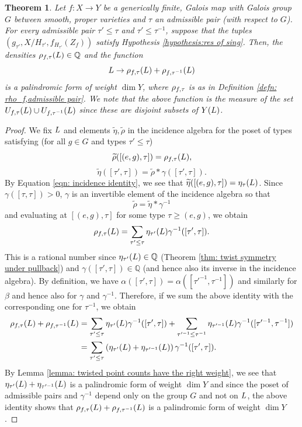 \documentclass[10pt]{article}
\theoremstyle{plain}
\newtheorem{thm}[theorem]{Theorem}
\theoremstyle{definition}
\numberwithin{equation}{section}
\begin{document}
\begin{thm}\label{thm: Main theorem, density fixing inertia and frobenius coset}
Let $f:X\to Y$ be a generically finite, Galois map with Galois group $G$ between \emph{smooth, proper} varieties and $\tau$ an admissible pair (with respect to $G$). For every admissible pair $\tau' \leq \tau$ and $\tau' \leq \tau^{-1}$, suppose that the tuples $(g_{\tau'},X/H_{\tau'},f_{H_{\tau'}}(Z_f))$ satisfy Hypothesis \ref{hypothesis:res of sing}. Then, the densities $\rho_{f,\tau}({L}) \in \mathbb Q$ and the function
\[{L} \to \rho_{f,\tau}({L}) + \rho_{f,\tau^{-1}}({L})\]
is a palindromic form of weight $\dim Y$, where $\rho_{f,\tau}$ is as in Definition \ref{defn: rho_f,admissible pair}. We note that the above function is the measure of the set $U_{f,\tau}({L}) \cup U_{f,\tau^{-1}}({L})$ since these are disjoint subsets of $Y({L})$.
\end{thm}
\begin{proof}

We fix ${L}$ and elements $\widetilde{\eta},\widetilde{\rho}$ in the incidence algebra for the poset of types satisfying (for all $g \in G$ and types $\tau' \leq \tau$) 
\[\widetilde{\rho}([(e,g),\tau]) = \rho_{f,\tau}({L}),\]
\[\widetilde{\eta}([\tau',\tau]) = \widetilde\rho\ast\gamma([\tau',\tau]).\]
By Equation \ref{eqn: incidence identity}, we see that $\widetilde{\eta}([(e,g),\tau]) = \eta_\tau({L})$. Since $\gamma([\tau,\tau]) > 0$, $\gamma$ is an invertible element of the incidence algebra so that
\[\widetilde\rho = \widetilde\eta\ast\gamma^{-1}\]
and evaluating at $[(e,g),\tau]$ for some type $\tau \geq (e,g)$, we obtain
\[\rho_{f,\tau}({L}) = \sum_{\tau'\leq \tau}{\eta_{\tau'}({L})}\gamma^{-1}([\tau',\tau]).\]
This is a rational number since $\eta_{\tau'}({L}) \in \mathbb Q$ (Theorem \ref{thm: twist symmetry under pullback}) and $\gamma([\tau',\tau]) \in \mathbb Q$ (and hence also its inverse in the incidence algebra). By definition, we have $\alpha([\tau',\tau]) = \alpha([\tau'^{-1},\tau^{-1}])$ and similarly for $\beta$ and hence also for $\gamma$ and $\gamma^{-1}$. Therefore, if we sum the above identity with the corresponding one for $\tau^{-1}$, we obtain
\begin{align*}
    \rho_{f,\tau}({L}) + \rho_{f,\tau^{-1}}({L}) &= \sum_{\tau'\leq \tau}{\eta_{\tau'}({L})} \gamma^{-1}([\tau',\tau]) + \sum_{\tau'^{-1}\leq \tau^{-1}}{\eta_{\tau'^{-1}}({L})}\gamma^{-1}([\tau'^{-1},\tau^{-1}])\\
    &=\sum_{\tau'\leq \tau}\left(\eta_{\tau'}({L}) + \eta_{\tau'^{-1}}({L})\right){\gamma^{-1}([\tau',\tau])}.
\end{align*}
By Lemma \ref{lemma: twisted point counts have the right weight}, we see that $\eta_{\tau'}({L}) + \eta_{\tau'^{-1}}({L})$ is a palindromic form of weight $\dim Y$ and since the poset of admissible pairs and $\gamma^{-1}$ depend only on the group $G$ and not on ${L}$, the above identity shows that $\rho_{f,\tau}({L}) + \rho_{f,\tau^{-1}}({L})$ is a palindromic form of weight $\dim Y$.
\end{proof}
\end{document}
